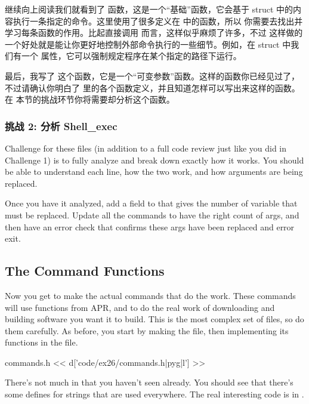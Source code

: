 继续向上阅读我们就看到了  函数，这是一个“基础”函数，它会基于  struct 
中的内容执行一条指定的命令。这里使用了很多定义在  中的函数，所以
你需要去找出并学习每条函数的作用。比起直接调用  而言，这样似乎麻烦了许多，不过
这样做的一个好处就是能让你更好地控制外部命令执行的一些细节。例如，在  struct 
中我们有一个  属性，它可以强制规定程序在某个指定的路径下运行。

最后，我写了  这个函数，它是一个“可变参数”函数。这样的函数你已经见过了，
不过请确认你明白了  里的各个函数定义，并且知道怎样可以写出来这样的函数。在
本节的挑战环节你将需要却分析这个函数。

\subsubsection{挑战 2: 分析 Shell\_exec}

Challenge for these files (in addition to a full code review just like you
did in Challenge 1) is to fully analyze  and break down
exactly how it works.  You should be able to understand each line, how
the two  work, and how arguments are being replaced.

Once you have it analyzed, add a field to  that gives
the number of variable  that must be replaced.  Update all the
commands to have the right count of args, and then have an error check that
confirms these args have been replaced and error exit.

\subsection{The Command Functions}

Now you get to make the actual commands that do the work.  These commands
will use functions from APR,  and  to do the 
real work of downloading and building software you want it to build.
This is the most complex set of files, so do them carefully.  As before, you
start by making the  file, then implementing its functions
in the  file.

\begin{code}{commands.h}
<< d['code/ex26/commands.h|pyg|l'] >>
\end{code}

There's not much in  that you haven't seen already.  You
should see that there's some defines for strings that are used everywhere.
The real interesting code is in .

